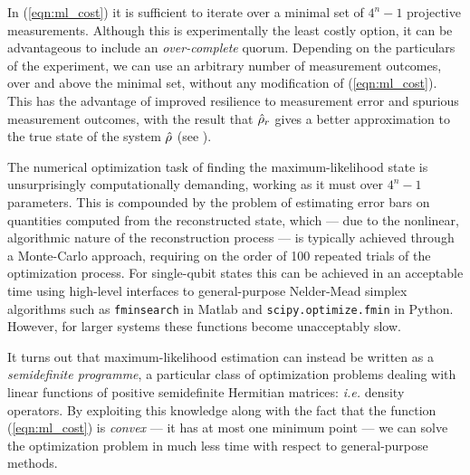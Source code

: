 In (\ref{eqn:ml_cost}) it is sufficient to iterate over a minimal set of $4^n-1$ projective measurements. Although this is experimentally the least costly option, it can be advantageous to 
include an \emph{over-complete} quorum. Depending on the particulars of the experiment, we can use an arbitrary number of measurement outcomes, over and above the minimal set, without any modification of (\ref{eqn:ml_cost}). This has the advantage of improved resilience to measurement error and spurious measurement outcomes, with the result that $\hat{\rho}_r$ gives a better approximation to the true state of the system $\hat{\rho}$ (see \cite{LangfordThesis}).

The numerical optimization task of finding the maximum-likelihood state is unsurprisingly computationally demanding, working as it must over $4^n-1$ parameters. This is compounded by the problem of estimating error bars on quantities computed from the reconstructed state, which --- due to the nonlinear, algorithmic nature of the reconstruction process --- is typically achieved through a Monte-Carlo approach,  requiring on the order of 100 repeated trials of the optimization process.  For single-qubit states this can be achieved in an acceptable time using high-level interfaces to general-purpose Nelder-Mead simplex algorithms such as \texttt{fminsearch} in Matlab and \texttt{scipy.optimize.fmin} in Python. However, for larger systems these functions become unacceptably slow. 

It turns out that maximum-likelihood estimation can instead be written as a \emph{semidefinite programme}, a particular class of optimization problems dealing with linear functions of positive semidefinite Hermitian matrices: \emph{i.e.} density operators. By exploiting this knowledge along with the fact that the function (\ref{eqn:ml_cost}) is \emph{convex} --- it has at most one minimum point --- we can solve the optimization problem in much less time with respect to general-purpose methods. 

